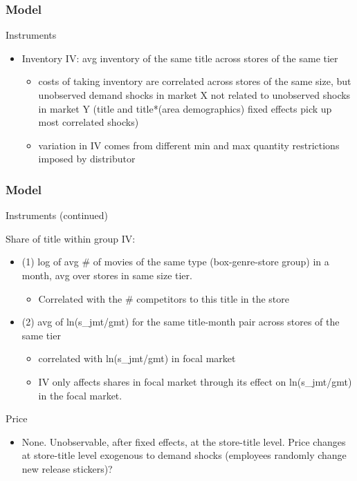 
\begin{frame}
\frametitle{Model}

Instruments

\begin{itemize}
\item Inventory IV: avg inventory of the same title across stores of the
same tier

\begin{itemize}
\item costs of taking inventory are correlated across stores of the same
size, but unobserved demand shocks in market X not related to unobserved
shocks in market Y (title and title*(area demographics) fixed
effects pick up most correlated shocks)

\item variation in IV comes from different min and max quantity restrictions
imposed by distributor
\end{itemize}
\end{itemize}
\end{frame}


\begin{frame}
\frametitle{Model}

Instruments (continued)

Share of title within group IV:

\begin{itemize}
\item (1) log of avg \# of movies of the same type (box-genre-store group)
in a month, avg over stores in same size tier.

\begin{itemize}
\item Correlated with the \# competitors to this title in the store
\end{itemize}

\item (2) avg of ln(s\_jmt/gmt) for the same title-month pair across stores
of the same tier

\begin{itemize}
\item correlated with ln(s\_jmt/gmt) in focal market

\item IV only affects shares in focal market through its effect on
ln(s\_jmt/gmt) in the focal market.
\end{itemize}
\end{itemize}

Price

\begin{itemize}
\item None. Unobservable, after fixed effects, at the store-title level.
Price changes at store-title level exogenous to demand shocks
(employees randomly change new release stickers)?
\end{itemize}
\end{frame}

